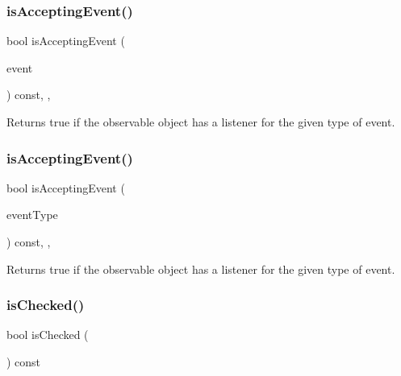 \subsubsection{\texorpdfstring{is\+Accepting\+Event()}{isAcceptingEvent()}\hspace{0.1cm}{\footnotesize\ttfamily [2/3]}}
{\footnotesize\ttfamily bool is\+Accepting\+Event (\begin{DoxyParamCaption}\item[{const \mbox{\hyperlink{classsgl_1_1GEvent}{G\+Event}} \&}]{event }\end{DoxyParamCaption}) const\hspace{0.3cm}{\ttfamily [protected]}, {\ttfamily [virtual]}, {\ttfamily [inherited]}}



Returns true if the observable object has a listener for the given type of event. 

\mbox{\label{classsgl_1_1GObservable_a3b1c689267eda44e65a2213e7de38b23}} 
\subsubsection{\texorpdfstring{is\+Accepting\+Event()}{isAcceptingEvent()}\hspace{0.1cm}{\footnotesize\ttfamily [3/3]}}
{\footnotesize\ttfamily bool is\+Accepting\+Event (\begin{DoxyParamCaption}\item[{const std\+::string \&}]{event\+Type }\end{DoxyParamCaption}) const\hspace{0.3cm}{\ttfamily [protected]}, {\ttfamily [virtual]}, {\ttfamily [inherited]}}



Returns true if the observable object has a listener for the given type of event. 

\mbox{\label{classsgl_1_1GRadioButton_ac8cada18b9357ff68b26e17f44294764}} 
\subsubsection{\texorpdfstring{is\+Checked()}{isChecked()}}
{\footnotesize\ttfamily bool is\+Checked (\begin{DoxyParamCaption}{ }\end{DoxyParamCaption}) const\hspace{0.3cm}{\ttfamily [virtual]}}



